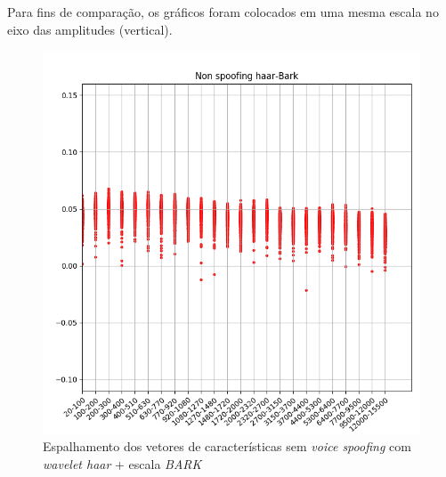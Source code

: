 		\par Para fins de comparação, os gráficos foram colocados em uma mesma escala no eixo das amplitudes (vertical).
		\begin{figure}
			\centering
			\includegraphics[width=\linewidth]{images/results/barkVersusMel/liveHaarBark}
			\caption{Espalhamento dos vetores de características sem \textit{voice spoofing} com \textit{wavelet haar} + escala \textit{BARK} }
			\label{fig:livehaarbark}
		\end{figure}
	
